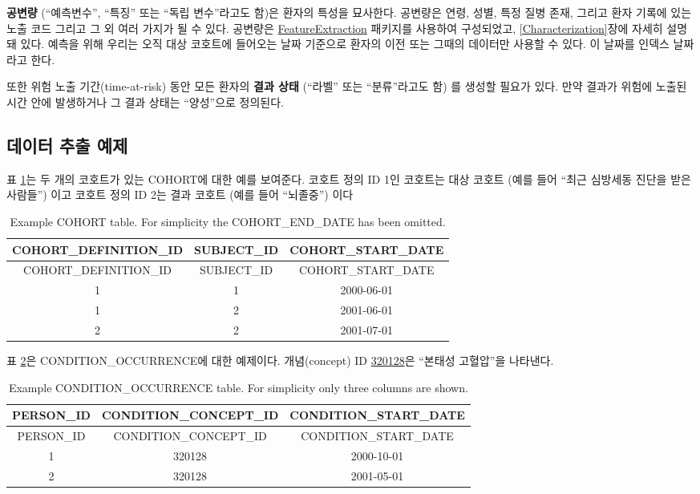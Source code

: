 \documentclass[10.5pt]{book}
\theoremstyle{definition}
\theoremstyle{definition}
\theoremstyle{definition}
\theoremstyle{remark}
\begin{document}
\textbf{공변량} (``예측변수'', ``특징'' 또는 ``독립 변수''라고도 함)은
환자의 특성을 묘사한다. 공변량은 연령, 성별, 특정 질병 존재, 그리고 환자
기록에 있는 노출 코드 그리고 그 외 여러 가지가 될 수 있다. 공변량은
\href{https://ohdsi.github.io/FeatureExtraction/}{FeatureExtraction}
패키지를 사용하여 구성되었고, \ref{Characterization}장에 자세히 설명돼
있다. 예측을 위해 우리는 오직 대상 코호트에 들어오는 날짜 기준으로
환자의 이전 또는 그때의 데이터만 사용할 수 있다. 이 날짜를 인덱스
날짜라고 한다.

또한 위험 노출 기간(time-at-risk) 동안 모든 환자의 \textbf{결과 상태}
(``라벨'' 또는 ``분류''라고도 함) 를 생성할 필요가 있다. 만약 결과가
위험에 노출된 시간 안에 발생하거나 그 결과 상태는 ``양성''으로
정의된다.  

\subsection{데이터 추출 예제}\label{--}

표 \ref{tab:plpExampleCohorts}는 두 개의 코호트가 있는 COHORT에 대한
예를 보여준다. 코호트 정의 ID 1인 코호트는 대상 코호트 (예를 들어 ``최근
심방세동 진단을 받은 사람들'') 이고 코호트 정의 ID 2는 결과 코호트 (예를
들어 ``뇌졸중'') 이다

\begin{longtable}[]{@{}ccc@{}}
\caption{\label{tab:plpExampleCohorts} Example COHORT table. For simplicity
the COHORT\_END\_DATE has been omitted.}\tabularnewline
\toprule
COHORT\_DEFINITION\_ID & SUBJECT\_ID &
COHORT\_START\_DATE\tabularnewline
\midrule
\endfirsthead
\toprule
COHORT\_DEFINITION\_ID & SUBJECT\_ID &
COHORT\_START\_DATE\tabularnewline
\midrule
\endhead
1 & 1 & 2000-06-01\tabularnewline
1 & 2 & 2001-06-01\tabularnewline
2 & 2 & 2001-07-01\tabularnewline
\bottomrule
\end{longtable}

표 \ref{tab:plpExampleConditions}은 CONDITION\_OCCURRENCE에 대한
예제이다. 개념(concept) ID
\href{http://athena.ohdsi.org/search-terms/terms/320128}{320128}은
``본태성 고혈압''을 나타낸다.

\begin{longtable}[]{@{}ccc@{}}
\caption{\label{tab:plpExampleConditions} Example CONDITION\_OCCURRENCE
table. For simplicity only three columns are shown.}\tabularnewline
\toprule
PERSON\_ID & CONDITION\_CONCEPT\_ID &
CONDITION\_START\_DATE\tabularnewline
\midrule
\endfirsthead
\toprule
PERSON\_ID & CONDITION\_CONCEPT\_ID &
CONDITION\_START\_DATE\tabularnewline
\midrule
\endhead
1 & 320128 & 2000-10-01\tabularnewline
2 & 320128 & 2001-05-01\tabularnewline
\bottomrule
\end{longtable}
\end{document}
